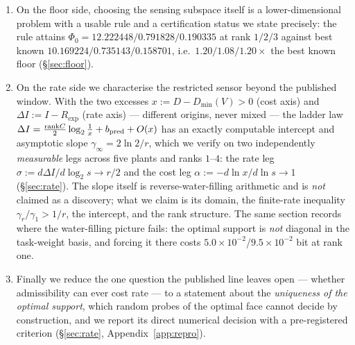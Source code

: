 \documentclass[journal]{IEEEtran}
\theoremstyle{remark}
\begin{document}
\begin{enumerate}
\item On the floor side, choosing the sensing subspace itself is a
      lower-dimensional problem with a usable rule and a certification status we
      state precisely: the rule attains
      $\Phi_0=12.222448/0.791828/0.190335$ at rank $1/2/3$ against best known
      $10.169224/0.735143/0.158701$, i.e.\ $1.20/1.08/1.20\times$ the best known
      floor (\S\ref{sec:floor}).
\item On the rate side we characterise the restricted sensor beyond the published
      window. With the two excesses $x:=D-D_{\min}(V)>0$ (cost axis) and
      $\Delta I:=I-R_{\exp}$ (rate axis) --- different origins, never mixed --- the
      ladder law
      $\Delta I=\frac{\mathrm{rank}C}{2}\log_2\frac1x+b_{\rm pred}+O(x)$ has an
      exactly computable intercept and asymptotic slope
      $\gamma_\infty=2\ln2/r$, which we verify on two independently
      \emph{measurable} legs across five plants and ranks $1$--$4$: the rate leg
      $\sigma:=d\Delta I/d\log_2s\to r/2$ and the cost leg
      $\alpha:=-d\ln x/d\ln s\to1$ (\S\ref{sec:rate}). The slope itself is
      reverse-water-filling arithmetic and is \emph{not} claimed as a discovery;
      what we claim is its domain, the finite-rate inequality
      $\gamma_r/\gamma_1>1/r$, the intercept, and the rank structure.
      The same section records where the water-filling picture fails: the optimal
      support is \emph{not} diagonal in the task-weight basis, and forcing it
      there costs $5.0\times10^{-2}$/$9.5\times10^{-2}$ bit at rank one.
\item Finally we reduce the one question the published line leaves open ---
      whether admissibility can ever cost rate --- to a statement about the
      \emph{uniqueness of the optimal support}, which random probes of the
      optimal face cannot decide by construction, and we report its direct
      numerical decision with a pre-registered criterion
      (\S\ref{sec:rate}, Appendix~\ref{app:repro}).
\end{enumerate}
\end{document}
